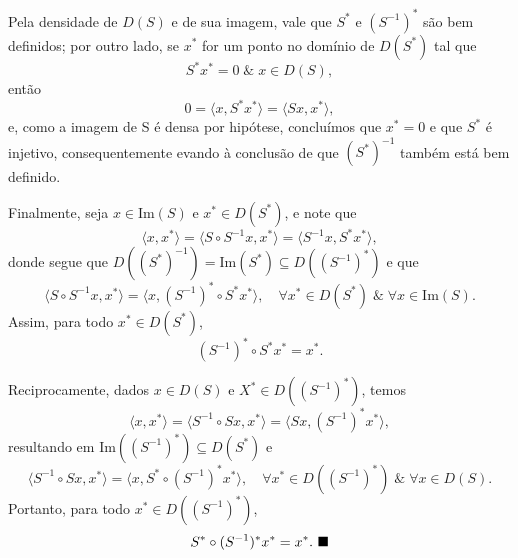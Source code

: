 \documentclass[../functional_analysis.tex]{subfiles}
\begin{document}
\begin{proof*}
	Pela densidade de \(D(S)\) e de sua imagem, vale que \(S^{*}\) e \((S^{-1})^{*}\) são bem definidos; por outro lado, se \(x^{*}\) for um ponto no domínio de \(D(S^{*})\) tal que
	\[
		S^{*}x^{*} = 0\;\& \; x\in D(S),
	\]
	então
	\[
		0 = \langle x, S^{*}x^{*} \rangle = \langle Sx, x^{*} \rangle,
	\]
	e, como a imagem de S é densa por hipótese, concluímos que \(x^{*} = 0\) e que \(S^{*}\) é injetivo, consequentemente evando à conclusão de que \((S^{*})^{-1}\) também está bem definido.

	Finalmente, seja \(x\in \mathrm{Im}(S)\) e \(x^{*}\in D(S^{*})\), e note que
	\[
		\langle x, x^{*} \rangle = \langle S\circ S^{-1}x, x^{*} \rangle = \langle S^{-1}x, S^{*}x^{*} \rangle,
	\]
	donde segue que \(D((S^{*})^{-1}) = \mathrm{Im}(S^{*}) \subseteq D((S^{-1})^{*})\) e que
	\[
		\langle S\circ S^{-1}x, x^{*} \rangle = \langle x, (S^{-1})^{*}\circ S^{*}x^{*} \rangle, \quad \forall x^{*}\in D(S^{*})\;\&\; \forall x\in \mathrm{Im}(S).
	\]
	Assim, para todo \(x^{*}\in D(S^{*})\),
	\[
		(S^{-1})^{*}\circ S^{*}x^{*} = x^{*}.
	\]

	Reciprocamente, dados \(x\in D(S)\) e \(X^{*}\in D((S^{-1})^{*})\), temos
	\[
		\langle x, x^{*} \rangle = \langle S^{-1}\circ Sx, x^{*} \rangle = \langle Sx, (S^{-1})^{*}x^{*} \rangle,
	\]
	resultando em \(\mathrm{Im}((S^{-1})^{*})\subseteq D(S^{*})\) e
	\[
		\langle S^{-1}\circ Sx, x^{*} \rangle = \langle x, S^{*}\circ (S^{-1})^{*}x^{*} \rangle, \quad \forall x^{*}\in D((S^{-1})^{*})\;\&\; \forall x\in D(S).
	\]
	Portanto, para todo \(x^{*}\in D((S^{-1})^{*})\),
	\[
		S^{*}\circ (S^{-1})^{*}x^{*} = x^{*}.\text{ $\blacksquare$} \]
\end{proof*}
\end{document}
